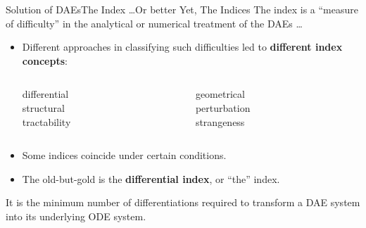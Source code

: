 \begin{frame}{Solution of \aclp{DAE}}{The Index \dots Or better Yet, The Indices}
  The index is a ``measure of difficulty'' in the analytical or numerical treatment of the \acp{DAE} \dots
  \begin{itemize}
    \item Different approaches in classifying such difficulties led to \textbf{different index concepts}:
    \begin{columns}
      \begin{column}[t]{0.45\textwidth}
        \centering\small
        differential \\
        structural \\
        tractability
      \end{column}
      \begin{column}[t]{0.45\textwidth}
        \centering\small
        geometrical \\
        perturbation \\
        strangeness
      \end{column}
    \end{columns}
    \item Some indices coincide under certain conditions.
    \item The old-but-gold is the \textbf{differential index}, or ``the'' index.
  \end{itemize}
  \vspace{0.5em}
  \begin{bbox}
    It is the minimum number of differentiations required to transform a \ac{DAE} system into its underlying \ac{ODE} system.
  \end{bbox}
\end{frame}

